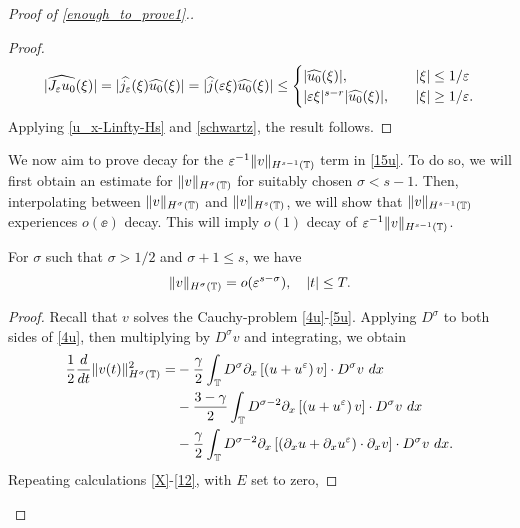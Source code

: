 \begin{proof}[Proof of \eqref{enough_to_prove1}.]
\begin{proof}
%
%
\begin{equation}
   \label{schwartz}
	|\widehat{J_\varepsilon u_0}(\xi)| = |\widehat{j_\varepsilon}(\xi) \widehat{u_0}(\xi)|
	= |\widehat{j }(\varepsilon \xi) \widehat{u_0}(\xi)| 
\le 
  \begin{cases}
    | \widehat{u_{0}}(\xi) |, \quad & | \xi | \le 1/\varepsilon
\\
| \varepsilon \xi |^{s-r} | \widehat{u_{0}}(\xi) |, \quad  & | \xi | \ge 1/\varepsilon.
\end{cases}
\end{equation}
%
%
%
%
%
Applying \eqref{u_x-Linfty-Hs} and \eqref{schwartz}, the result follows.
\end{proof}
%
%
%
We now aim to prove decay for the $\varepsilon^{-1}
\|v\|_{H^{s-1}(\mathbb{T})} $ term in \eqref{15u}. To do so, we 
will first obtain an estimate for
$\|v\|_{H^\sigma(\mathbb{T})}$ for suitably chosen $\sigma < s-1$. Then, 
interpolating between $\|v\|_{H^\sigma(\mathbb{T})}$
and $\|v\|_{H^s(\mathbb{T})}$, we will show that 
$\|v\|_{H^{s-1}(\mathbb{T})}$ experiences $o(\ee)$ decay. This will imply
$o(1)$ decay of $\varepsilon^{-1}
\|v\|_{H^{s-1}(\mathbb{T})} $.
%
%
\begin{proposition} \label{prop:6r}
For $\sigma$ such that $\sigma > 1/2$ and $\sigma + 1 \le s$, we have
%
%
\begin{equation}
\begin{split}
\|v\|_{H^{\sigma}(\mathbb{T})} = o(\varepsilon^{s- \sigma }), \quad |t| \le T.
\end{split}
\end{equation}
%
%
\end{proposition}
%
%
%
\begin{proof}
Recall that $v$ solves the Cauchy-problem \eqref{4u}-\eqref{5u}.
Applying $D^\sigma$ to both sides of \eqref{4u}, then multiplying by
$D^\sigma v$ and integrating, we obtain 
%
%
\begin{equation*}
\begin{split}
\frac{1}{2}\frac{d}{dt}\|v(t)\|_{H^\sigma(\mathbb{T})}^2
= & - \frac{\gamma}{2}\int_{\mathbb{T}} D^\sigma
\partial_x \left[ \left( u + u^\varepsilon \right)v
\right]\cdot D^\sigma v \ dx
\\
& - \frac{3-\gamma}{2}\int_{\mathbb{T}} D^{\sigma
-2} \partial_x \left[ \left( u + u^\varepsilon
\right)v \right] \cdot D^\sigma v \ dx
\\
& - \frac{\gamma}{2}\int_{\mathbb{T}} D^{\sigma
-2}
\partial_x \left[ \left( \partial_x u + \partial_x u^\varepsilon
\right)\cdot \partial_x v \right] \cdot
D^\sigma v \ dx.
\end{split}
\end{equation*}
%
%
Repeating calculations \eqref{X}-\eqref{12}, with $E$ set to zero,

\end{proof}
\end{proof}

